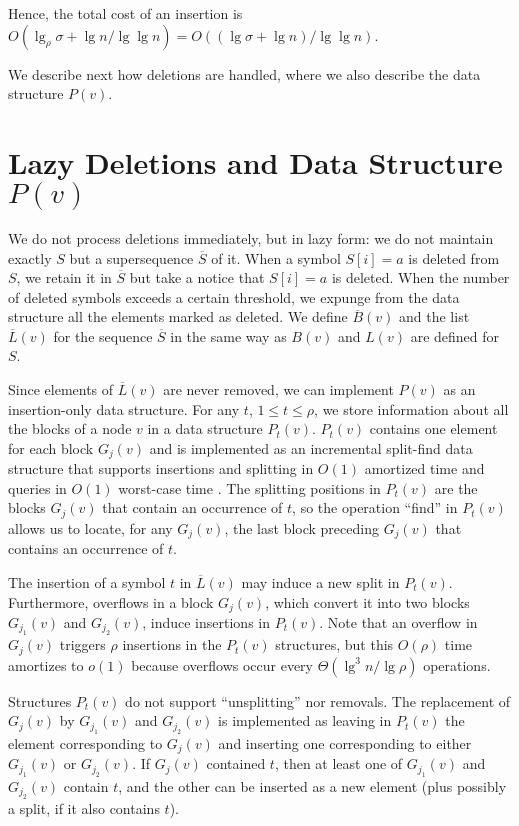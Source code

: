 \documentclass[11pt]{article}
\newcommand{\oS}{\overline{S}}
\newcommand{\oL}{\overline{L}}
\newcommand{\oB}{\overline{B}}
\begin{document}
Hence, the total cost of an insertion is $O(\lg_\rho\sigma+\lg n/\lg\lg n) =
O((\lg \sigma+ \lg n)/\lg\lg n)$.

We describe next how deletions are handled, where
we also describe the data structure $P(v)$. 

\section{Lazy Deletions and Data Structure $P(v)$}
\label{sec:rank}

We do not process deletions immediately, but in lazy form: we do not
maintain exactly $S$ but a supersequence $\oS$ of it. When a symbol $S[i]=a$ is 
deleted from $S$, we retain it in $\oS$ but take a notice that 
$S[i]=a$ is deleted. When the number of deleted symbols exceeds 
a certain threshold, we expunge from the data structure all the elements 
marked as deleted.
We define $\oB(v)$ and the list $\oL(v)$ for the sequence 
$\oS$ in the same way as $B(v)$ and $L(v)$ are defined for 
$S$.

Since elements of $\oL(v)$ are never removed, we can implement 
$P(v)$ as an insertion-only data structure. For any 
$t$, $1\le t \le \rho$, we store information about all the blocks 
of a node $v$ in a data structure $P_t(v)$. 
$P_t(v)$ contains one element for each block $G_j(v)$ and is 
implemented as an incremental split-find data structure that supports 
insertions and splitting in $O(1)$ amortized time and queries in $O(1)$ 
worst-case time 
\cite{IA84}. The splitting positions in $P_t(v)$ are the blocks $G_j(v)$ that 
contain an occurrence of $t$, so the operation ``find'' in $P_t(v)$ allows us 
to locate, for any $G_j(v)$, the last block preceding $G_j(v)$ that contains 
an occurrence of $t$. 

The insertion of a symbol $t$ in $\oL(v)$ may induce a new split in $P_t(v)$. 
Furthermore, overflows in a block $G_j(v)$, which convert it into two blocks 
$G_{j_1}(v)$ and $G_{j_2}(v)$, induce insertions in $P_t(v)$.
Note that an overflow in $G_j(v)$ triggers $\rho$ insertions in the $P_t(v)$
structures, but this $O(\rho)$ time amortizes to $o(1)$ because overflows
occur every $\Theta(\lg^3 n/\lg\rho)$ operations.

Structures $P_t(v)$ do not support ``unsplitting'' nor removals.
The replacement of $G_j(v)$ by  $G_{j_1}(v)$ and $G_{j_2}(v)$ is implemented as 
leaving in 
$P_t(v)$ the element corresponding to $G_j(v)$ and inserting one corresponding 
to either $G_{j_1}(v)$ or $G_{j_2}(v)$. If $G_j(v)$ contained $t$, then at
least one of $G_{j_1}(v)$ and $G_{j_2}(v)$ contain $t$, and the other can be
inserted as a new element (plus possibly a split, if it also contains $t$).
\end{document}
